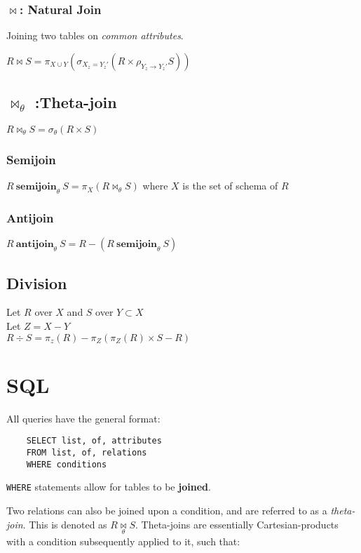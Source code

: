 \documentclass{article}
\begin{document}
\subsubsection*{$\Join$: Natural Join}

Joining two tables on \textit{common attributes}.

$ R \Join S = \pi_{X\cup Y}(\sigma_{X_z = Y_z'}(R \times \rho_{Y_z \rightarrow Y_z'} S))$

\subsection*{$\Join_\theta$ :Theta-join}
$R \Join_\theta S = \sigma_\theta(R\times S)$

\subsubsection*{Semijoin}
$R \:\textbf{semijoin}_\theta\: S = \pi_{X} (R \Join_\theta S)$ where $X$ is the set of schema of $R$

\subsubsection*{Antijoin}
$R \:\textbf{antijoin}_\theta\: S = R - (R \:\textbf{semijoin}_\theta\: S)$

\subsection*{Division}
Let $R$ over $X$ and $S$ over $Y \subset X$ \\
Let $Z = X-Y$\\
$R \div S = \pi_z(R) - \pi_Z(\pi_Z(R) \times S - R)$

\section{SQL}

All queries have the general format:

\begin{lstlisting}
    SELECT list, of, attributes
    FROM list, of, relations
    WHERE conditions
\end{lstlisting}

\texttt{WHERE} statements allow for tables to be \textbf{joined}.

Two relations can also be joined upon a condition, and are referred to as a \textit{theta-join}. This is denoted as $R \underset{\theta}{\Join} S$. Theta-joins are essentially Cartesian-products with a condition subsequently applied to it, such that:
\end{document}
